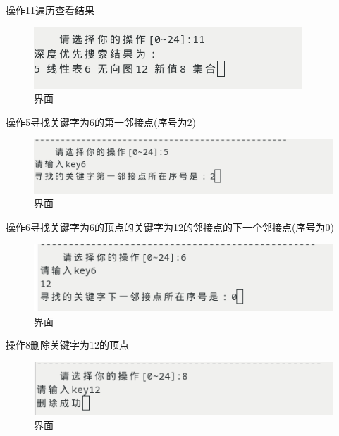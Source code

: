 \documentclass[supercite]{Experimental_Report}
\theoremstyle{definition}
\begin{document}
操作11遍历查看结果

\begin{figure}[!htb]
	\begin{center}
		\includegraphics[scale=0.60]{images/2-12.png}
		\caption{界面}
		\label{fig2-12}
		\end{center}
\end{figure}

操作5寻找关键字为6的第一邻接点(序号为2)

\begin{figure}[!htb]
	\begin{center}
		\includegraphics[scale=0.60]{images/2-13.png}
		\caption{界面}
		\label{fig2-13}
		\end{center}
\end{figure}

操作6寻找关键字为6的顶点的关键字为12的邻接点的下一个邻接点(序号为0)

\begin{figure}[!htb]
	\begin{center}
		\includegraphics[scale=0.60]{images/2-14.png}
		\caption{界面}
		\label{fig2-14}
		\end{center}
\end{figure}

操作8删除关键字为12的顶点

\begin{figure}[!htb]
	\begin{center}
		\includegraphics[scale=0.60]{images/2-15.png}
		\caption{界面}
		\label{fig2-15}
		\end{center}
\end{figure}
\end{document}
